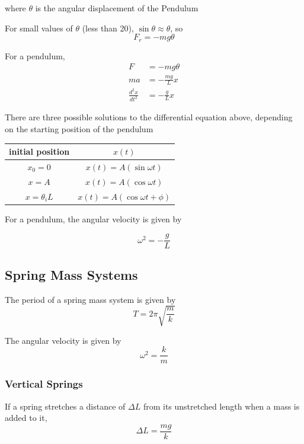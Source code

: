 \documentclass[titlepage]{article}
\begin{document}
where $\theta$ is the angular displacement of the Pendulum

For small values of $\theta$ (less than 20\textdegree), $\sin \theta \approx \theta$, so
\begin{equation*}
    F_r = -mg \theta
\end{equation*}

For a pendulum,
\begin{align*}
    F                  & = -mg \theta       \\
    ma                 & = -\frac{mg}{L}{x} \\
    \frac{d^2 x}{dt^2} & = -\frac{g}{L}x
\end{align*}

There are three possible solutions to the differential equation above, depending on the starting position of the pendulum

\begin{table}[H]
    \centering
    \makegapedcells
    \begin{tabular}{c|c}
        {initial position} & \textbf{$x(t)$}                   \\
        \hline
        $x_0 = 0$          & $x(t) = A(\sin{\omega t})$        \\
        $x = A$            & $x(t) = A(\cos{\omega t})$        \\
        $x = \theta_i L$   & $x(t) = A(\cos{\omega t + \phi})$ \\
    \end{tabular}
\end{table}

For a pendulum, the angular velocity is given by

\begin{equation*}
    \omega^2 = -\frac{g}{L}
\end{equation*}

\subsection{Spring Mass Systems}
The period of a spring mass system is given by
\begin{equation*}
    T = 2 \pi \sqrt{\frac{m}{k}}
\end{equation*}

The angular velocity is given by
\begin{equation*}
    \omega ^ 2 = \frac{k}{m}
\end{equation*}

\subsubsection{Vertical Springs}
If a spring stretches a distance of $\Delta L$ from its unstretched length when a mass is added to it,
\begin{equation*}
    \Delta L = \frac{mg}{k}
\end{equation*}
\end{document}
